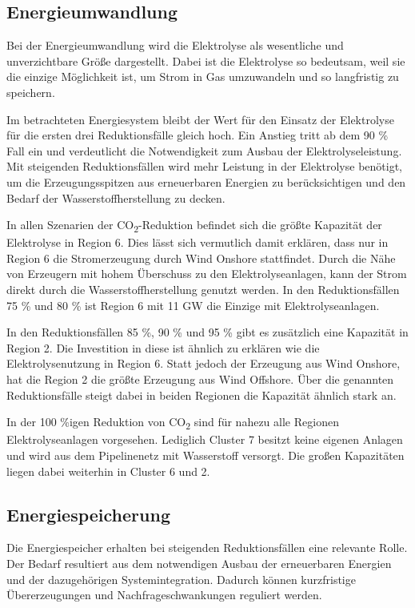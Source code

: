 \subsection{Energieumwandlung}
Bei der Energieumwandlung wird die Elektrolyse als wesentliche und unverzichtbare Größe dargestellt. Dabei ist die Elektrolyse so bedeutsam, weil sie die einzige Möglichkeit ist, um Strom in Gas umzuwandeln und so langfristig zu speichern.

Im betrachteten Energiesystem bleibt der Wert für den Einsatz der Elektrolyse für die ersten drei Reduktionsfälle gleich hoch. Ein Anstieg tritt ab dem 90 \% Fall ein und verdeutlicht die Notwendigkeit zum Ausbau der Elektrolyseleistung. Mit steigenden Reduktionsfällen wird mehr Leistung in der Elektrolyse benötigt, um die Erzeugungsspitzen aus erneuerbaren Energien zu berücksichtigen und den Bedarf der Wasserstoffherstellung zu decken. 


In allen Szenarien der CO\textsubscript{2}-Reduktion befindet sich die größte Kapazität der Elektrolyse in Region 6. Dies lässt sich vermutlich damit erklären, dass nur in Region 6 die Stromerzeugung durch Wind Onshore stattfindet. Durch die Nähe von Erzeugern mit hohem Überschuss zu den Elektrolyseanlagen, kann der Strom direkt durch die Wasserstoffherstellung genutzt werden. In den Reduktionsfällen 75 \% und 80 \% ist Region 6 mit 11 GW die Einzige mit Elektrolyseanlagen.

In den Reduktionsfällen 85 \%, 90 \% und 95 \% gibt es zusätzlich eine Kapazität in Region 2. Die Investition in diese ist ähnlich zu erklären wie die Elektrolysenutzung in Region 6. Statt jedoch der Erzeugung aus Wind Onshore, hat die Region 2 die größte Erzeugung aus Wind Offshore.
Über die genannten Reduktionsfälle steigt dabei in beiden Regionen die Kapazität ähnlich stark an. 

In der 100 \%igen Reduktion von CO\textsubscript{2} sind für nahezu alle Regionen Elektrolyseanlagen vorgesehen. Lediglich Cluster 7 besitzt keine eigenen Anlagen und wird aus dem Pipelinenetz mit Wasserstoff versorgt. Die großen Kapazitäten liegen dabei weiterhin in Cluster 6 und 2.

\subsection{Energiespeicherung}
Die Energiespeicher erhalten bei steigenden Reduktionsfällen eine relevante Rolle. Der Bedarf resultiert aus dem notwendigen Ausbau der erneuerbaren Energien und der dazugehörigen Systemintegration. 
Dadurch können kurzfristige Übererzeugungen und Nachfrageschwankungen reguliert werden. 

